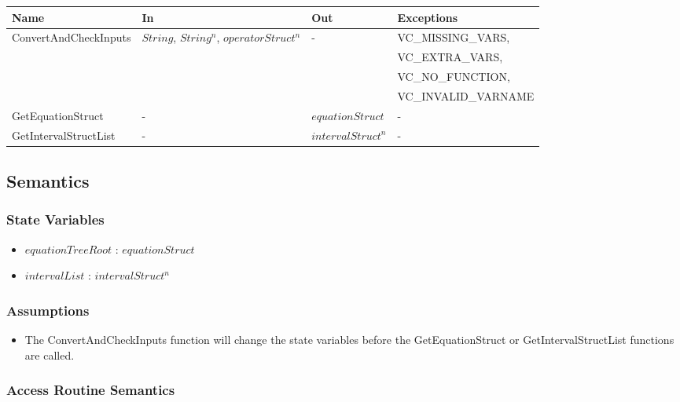 \documentclass[12pt, titlepage]{article}
\begin{document}
\begin{center}
	\begin{tabular}{p{4.3cm} p{2.7cm} p{3cm} p{4.3cm}}
		\hline
		\textbf{Name} & \textbf{In} & \textbf{Out} & \textbf{Exceptions} \\
		\hline
		\multirow{4}{4.3cm}{ConvertAndCheckInputs} & 
		\multirow{4}{2.3cm}{$String$, $String^n$, $operatorStruct^n$} & 
		\multirow{4}{3cm}{-} & VC\_MISSING\_VARS, \\
		& & & VC\_EXTRA\_VARS, \\
		& & & VC\_NO\_FUNCTION, \\
		& & & VC\_INVALID\_VARNAME \\
		GetEquationStruct & - & $equationStruct$ & - \\
		GetIntervalStructList & - & $intervalStruct^n$ & - \\
		\hline
	\end{tabular}
\end{center}

\subsection{Semantics}

\subsubsection{State Variables}

\begin{itemize}
	\item $equationTreeRoot$ : $equationStruct$
	\item $intervalList$ : $intervalStruct^n$
\end{itemize}

\subsubsection{Assumptions}

\begin{itemize}
	\item The ConvertAndCheckInputs function will change the state variables 
	before the GetEquationStruct or GetIntervalStructList functions are called.
\end{itemize}

\subsubsection{Access Routine Semantics}
\end{document}
